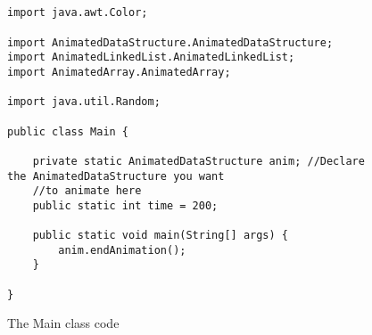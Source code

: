 \begin{figure}
\begin{center}
\begin{verbatim}


import java.awt.Color;

import AnimatedDataStructure.AnimatedDataStructure;
import AnimatedLinkedList.AnimatedLinkedList;
import AnimatedArray.AnimatedArray;

import java.util.Random;

public class Main {
    
    private static AnimatedDataStructure anim; //Declare the AnimatedDataStructure you want
	//to animate here
    public static int time = 200;
    
	public static void main(String[] args) {
        anim.endAnimation();
	}
	
}

\end{verbatim}
\end{center}
\caption{The Main class code}
\label{fig:main}
\end{figure}